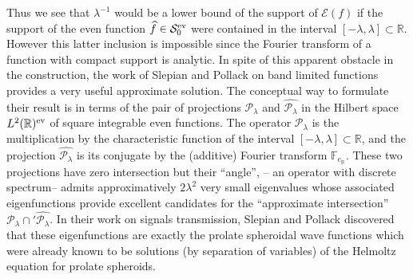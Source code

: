 \documentclass[cupthm]{CUP-JNL-JMJ}
\def\F{{\mathbb F}}
\def\R{{\mathbb R}}
\def\cE{{\mathcal E}}
\def\cP{{\mathcal P}}
\def\cS{{\mathcal S}}
\def\fourier{\F}
\def\sr0{{\cS^{\rm ev}_0}}
\def\fourierer{\fourier_{e_\R}}
\numberwithin{equation}{section}
\theoremstyle{cupplain}
\theoremstyle{cupdefinition}
\theoremstyle{cupremark}
\theoremstyle{cupproof}
\begin{document}
Thus  we see that $\lambda^{-1}$ would be a lower bound of the support of $\cE(f)$ if the support of the even function $\widehat f\in \sr0$ were contained in the interval $[-\lambda,\lambda]\subset \R$. However this latter inclusion is impossible  since  the Fourier transform of a function with compact support is analytic. In spite of this apparent obstacle in the construction, the work of Slepian and Pollack on band limited functions  \cite{Slepian0} provides a very useful approximate solution. The  conceptual way to formulate their result is in terms of   the pair of projections $\cP_\lambda$ and $\widehat{\cP_\lambda}$ in the Hilbert space $L^2(\R)^{\rm ev}$ of square integrable even functions. The operator $\cP_\lambda$ is  the   multiplication by the characteristic function of the interval  $[-\lambda,\lambda]\subset \R$, and the projection $\widehat{\cP_\lambda}$ is its conjugate by the (additive) Fourier transform $\fourierer$. These two projections   have zero intersection but their ``angle'', -- an operator with discrete spectrum-- admits approximatively $2 \lambda^2$  very small eigenvalues whose  associated eigenfunctions provide excellent candidates for the ``approximate intersection''  $\cP_\lambda \cap'\widehat{\cP_\lambda}$. In their work on signals transmission, Slepian and Pollack  discovered that these eigenfunctions are exactly the prolate spheroidal wave functions which were already known to be  solutions (by separation of variables) of the Helmoltz equation for prolate spheroids. 
\end{document}
